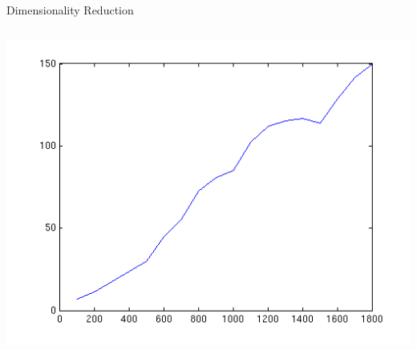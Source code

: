 \documentclass[final,t]{beamer}
\begin{document}
\begin{frame}{}
\begin{columns}[t]
\begin{column}{.3\linewidth}
\begin{block}{Dimensionality Reduction}
\begin{columns}[c]
         \includegraphics[width=0.97\linewidth]{images/dim_vs_runningtime.png}
       \end{columns}


\end{block}
\end{column}
\end{columns}
\end{frame}
\end{document}
